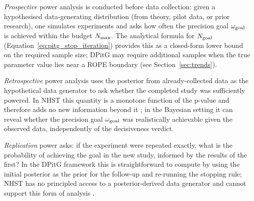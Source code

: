 \textit{Prospective} power analysis is conducted before data collection: given a
hypothesised data-generating distribution (from theory, pilot data, or prior research),
one simulates experiments and asks how often the precision goal $\omega_{\rm goal}$ is
achieved within the budget $N_{\rm max}$.
The analytical formula for $N_{\rm goal}$ (Equation~\ref{eq:pitg_stop_iteration})
provides this as a closed-form lower bound on the required sample size; DPitG may
require additional samples when the true parameter value lies near a ROPE boundary
(see Section~\ref{sec:trends}).

\textit{Retrospective} power analysis uses the posterior from already-collected data as
the hypothetical data generator to ask whether the completed study was sufficiently
powered. In NHST this quantity is a monotone function of the p-value and therefore adds
no new information beyond it \citep{hoenig2001}; in the Bayesian setting it can reveal
whether the precision goal $\omega_{\rm goal}$ was realistically achievable given the
observed data, independently of the decisiveness verdict.

\textit{Replication} power asks: if the experiment were repeated exactly, what is the
probability of achieving the goal in the new study, informed by the results of the
first? In the DPitG framework this is straightforward to compute by using the initial
posterior as the prior for the follow-up and re-running the stopping rule; NHST has
no principled access to a posterior-derived data generator and cannot support this
form of analysis \citep{kruschke2015doing}.
